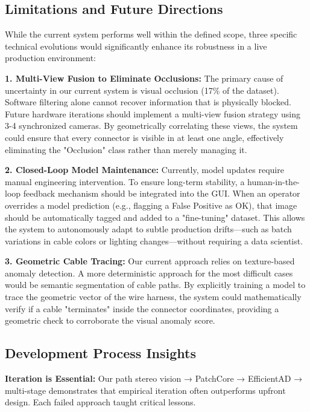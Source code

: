 \documentclass[11pt,a4paper,draft]{article}
\begin{document}
\subsection{Limitations and Future Directions}

While the current system performs well within the defined scope, three specific technical evolutions would significantly enhance its robustness in a live production environment:

\textbf{1. Multi-View Fusion to Eliminate Occlusions:}
The primary cause of uncertainty in our current system is visual occlusion (17\% of the dataset). Software filtering alone cannot recover information that is physically blocked. Future hardware iterations should implement a multi-view fusion strategy using 3-4 synchronized cameras. By geometrically correlating these views, the system could ensure that every connector is visible in at least one angle, effectively eliminating the "Occlusion" class rather than merely managing it.

\textbf{2. Closed-Loop Model Maintenance:}
Currently, model updates require manual engineering intervention. To ensure long-term stability, a human-in-the-loop feedback mechanism should be integrated into the GUI. When an operator overrides a model prediction (e.g., flagging a False Positive as OK), that image should be automatically tagged and added to a "fine-tuning" dataset. This allows the system to autonomously adapt to subtle production drifts—such as batch variations in cable colors or lighting changes—without requiring a data scientist.

\textbf{3. Geometric Cable Tracing:}
Our current approach relies on texture-based anomaly detection. A more deterministic approach for the most difficult cases would be semantic segmentation of cable paths. By explicitly training a model to trace the geometric vector of the wire harness, the system could mathematically verify if a cable "terminates" inside the connector coordinates, providing a geometric check to corroborate the visual anomaly score.

\subsection{Development Process Insights}

\textbf{Iteration is Essential:} Our path stereo vision → PatchCore → EfficientAD → multi-stage demonstrates that empirical iteration often outperforms upfront design. Each failed approach taught critical lessons.
\end{document}
